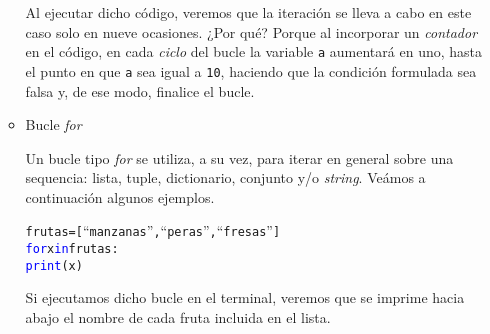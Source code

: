 \documentclass{article}
\begin{document}
\begin{enumerate}
\begin{itemize}
    \par \hspace{5pt} Al ejecutar dicho código, veremos que la iteración se lleva a cabo en este caso solo en nueve ocasiones. ¿Por qué? Porque al incorporar un \emph{contador} en el código, en cada \emph{ciclo} del bucle la variable \verb|a| aumentará en uno, hasta el punto en que \verb|a| sea igual a \verb|10|, haciendo que la condición formulada sea falsa y, de ese modo, finalice el bucle. \\

  \item Bucle \emph{for}
    \par \hspace{5pt} Un bucle tipo \emph{for} se utiliza, a su vez, para iterar en general sobre una sequencia: lista, tuple, dictionario, conjunto y/o \emph{string}. Veámos a continuación algunos ejemplos.

\begin{tcolorbox}
\begin{alltt}
frutas = [``manzanas'', ``peras'', ``fresas'']
\textcolor{blue}{for} x \textcolor{blue}{in} frutas:
    \textcolor{blue}{print}(x)
\end{alltt}        
\end{tcolorbox}    

\par \hspace{5pt} Si ejecutamos dicho bucle en el terminal, veremos que se imprime hacia abajo el nombre de cada fruta incluida en el lista.


\end{itemize}
\end{enumerate}
\end{document}
